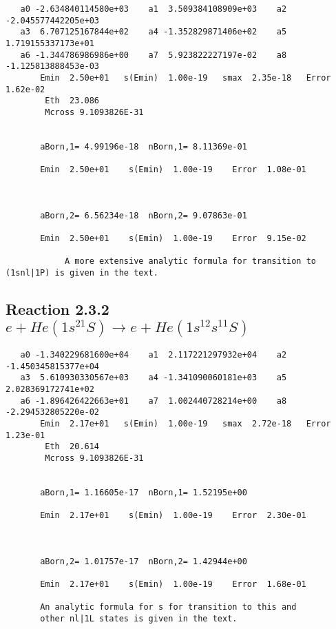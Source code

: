 \documentclass[12pt,dvipdfmx]{article}
\begin{document}
\begin{small}\begin{verbatim}
   a0 -2.634840114580e+03    a1  3.509384108909e+03    a2 -2.045577442205e+03
   a3  6.707125167844e+02    a4 -1.352829871406e+02    a5  1.719155337173e+01
   a6 -1.344786986986e+00    a7  5.923822227197e-02    a8 -1.125813888453e-03
       Emin  2.50e+01   s(Emin)  1.00e-19   smax  2.35e-18   Error  1.62e-02
        Eth  23.086
        Mcross 9.1093826E-31


       aBorn,1= 4.99196e-18  nBorn,1= 8.11369e-01

       Emin  2.50e+01    s(Emin)  1.00e-19    Error  1.08e-01



       aBorn,2= 6.56234e-18  nBorn,2= 9.07863e-01

       Emin  2.50e+01    s(Emin)  1.00e-19    Error  9.15e-02

            A more extensive analytic formula for transition to (1snl|1P) is given in the text.
\end{verbatim}\end{small}






\newpage
\subsection{
Reaction 2.3.2 $e + He(1s^21S) \rightarrow e + He(1s^12s^11S)$}

















\begin{small}\begin{verbatim}
   a0 -1.340229681600e+04    a1  2.117221297932e+04    a2 -1.450345815377e+04
   a3  5.610930330567e+03    a4 -1.341090060181e+03    a5  2.028369172741e+02
   a6 -1.896426422663e+01    a7  1.002440728214e+00    a8 -2.294532805220e-02
       Emin  2.17e+01   s(Emin)  1.00e-19   smax  2.72e-18   Error  1.23e-01
        Eth  20.614
        Mcross 9.1093826E-31


       aBorn,1= 1.16605e-17  nBorn,1= 1.52195e+00

       Emin  2.17e+01    s(Emin)  1.00e-19    Error  2.30e-01



       aBorn,2= 1.01757e-17  nBorn,2= 1.42944e+00

       Emin  2.17e+01    s(Emin)  1.00e-19    Error  1.68e-01

       An analytic formula for s for transition to this and
       other nl|1L states is given in the text.
\end{verbatim}\end{small}
\end{document}
